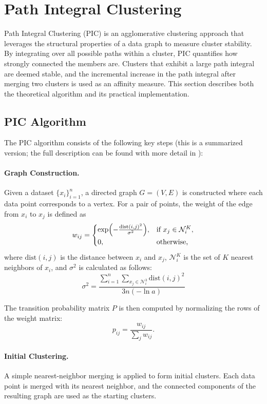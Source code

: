 \section{Path Integral Clustering}

Path Integral Clustering (PIC)\cite{PIC} is an agglomerative clustering approach that leverages the structural properties of a data graph to measure cluster stability. By integrating over all possible paths within a cluster, PIC quantifies how strongly connected the members are. Clusters that exhibit a large path integral are deemed stable, and the incremental increase in the path integral after merging two clusters is used as an affinity measure. This section describes both the theoretical algorithm and its practical implementation.

\subsection{PIC Algorithm}
The PIC algorithm consists of the following key steps (this is a summarized version; the full description can be found with more detail in \cite{PIC}):

\paragraph{Graph Construction.}  
Given a dataset $\{x_i\}_{i=1}^n$, a directed graph $G=(V,E)$ is constructed where each data point corresponds to a vertex. For a pair of points, the weight of the edge from $x_i$ to $x_j$ is defined as
\[
w_{ij} = \begin{cases}
\exp\Bigl(-\frac{\mathrm{dist}(i, j)^2}{\sigma^2}\Bigr), & \text{if } x_j \in \mathcal{N}_i^K,\\[1mm]
0, & \text{otherwise,}
\end{cases}
\]
where $\mathrm{dist}(i, j)$ is the distance between $x_i$ and $x_j$, $\mathcal{N}_i^K$ is the set of $K$ nearest neighbors of $x_i$, and $\sigma^2$ is calculated as follows:
\[
\sigma^2=\frac{\sum_{i=1}^n \sum_{x_j \in \mathcal{N}_i^3} \mathrm{dist}(i, j)^2}{3n(-\ln{a})}
\]

The transition probability matrix $P$ is then computed by normalizing the rows of the weight matrix:
\[
p_{ij} = \frac{w_{ij}}{\sum_{j} w_{ij}}.
\]

\paragraph{Initial Clustering.}  
A simple nearest-neighbor merging is applied to form initial clusters. Each data point is merged with its nearest neighbor, and the connected components of the resulting graph are used as the starting clusters.

